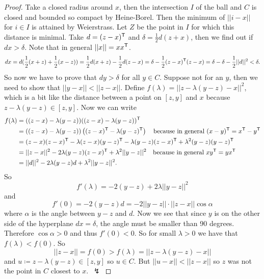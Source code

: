 \documentclass{exam}
\begin{document}
    \begin{proof}
        Take a closed radius around $x$, then the intersection $I$ of the ball and $C$ is closed and bounded so compact by Heine-Borel.
        Then the minimum of $||i-x||$ for $i \in I$ is attained by Weierstrass.
        Let $Z$ be the point in $I$ for which this distance is minimal.
        Take $d=(z-x)^{\mathsf{T}} $ and $\delta = \frac 1 2 d (z+x)$, then we find out if $dx>\delta$.
        Note that in general $||x||=xx^{\mathsf{T}}$.
        \[
            dx = d(\frac 1 2 (x+z) + \frac 1 2 (x-z)) = \frac 1 2 d (x+z) - \frac 1 2 d(z-x) = \delta - \frac 1 2 (z-x)^{\mathsf{T}} (z-x) = \delta - \delta - \frac 1 2 ||d||^2 < \delta.
        \]
        So now we have to prove that $dy>\delta$ for all $y \in C$.
        Suppose not for an $y$, then we need to show that $||y-x||<||z-x||$.
        Define $f(\lambda) = ||z-\lambda (y-z) -x ||^2$, which is a bit like the distance between a point on $[z,y]$ and $x$ because $z-\lambda(y-z) \in [z,y]$.
        Now we can write
        \begin{align*}
            f(\lambda)&= ((z-x)-\lambda(y-z))((z-x)-\lambda (y-z))^{\mathsf{T}} \\
            &=((z-x)-\lambda(y-z))\left( (z-x)^{\mathsf{T}} - \lambda (y-z)^{\mathsf{T}}  \right) \quad \text{because in general $(x-y)^{\mathsf{T}} = x^{\mathsf{T}} - y^{\mathsf{T}}$} \\
            &= (z-x)(z-x)^{\mathsf{T}} - \lambda (z-x)(y-z)^{\mathsf{T}} - \lambda (y-z)(z-x)^{\mathsf{T}} + \lambda^2 (y-z)(y-z)^{\mathsf{T}} \\
            &= ||z-x||^2 - 2\lambda (y-z) (z-x)^{\mathsf{T}} + \lambda ^2 ||y-z||^2 \quad \text{because in general $xy^{\mathsf{T}} = yx^{\mathsf{T}} $} \\
            &= ||d||^2 -2\lambda (y-z) d + \lambda ^2 ||y-z||^2.
        \end{align*}
        So
        \[
            f'(\lambda)= -2 (y-z) + 2 \lambda ||y-z||^2
        \]
        and
        \[
            f'(0) = -2 (y-z)d = -2 ||y-z||\cdot ||z-x|| \cos \alpha
        \]
        where $\alpha$ is the angle between $y-z$ and $d$.
        Now we see that since $y$ is on the other side of the hyperplane $dx=\delta$, the angle must be smaller than 90 degrees.
        Therefore $\cos \alpha >0$ and thus $f'(0)<0$.
        So for small $\lambda >0$ we have that $f(\lambda) < f(0)$.
        So
        \[
             ||z-x|| = f(0) > f(\lambda) = ||z-\lambda (y-z) -x ||
        \]
        and $u \coloneqq z-\lambda (y-z) \in [z,y]$ so $u \in C$.
        But $||u-x|| < ||z-x||$ so $z$ was not the point in $C$ closest to $x$.~$\lightning$
    \end{proof}
\end{document}
